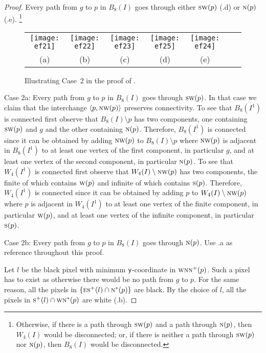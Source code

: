 \documentclass[lotsofwhite,charterfonts]{patmorin}
\newcommand{\N}{\textsc{n}}
\newcommand{\E}{\textsc{e}}
\renewcommand{\S}{\textsc{s}}
\newcommand{\SW}{\textsc{sw}}
\newcommand{\W}{\textsc{w}}
\newcommand{\NW}{\textsc{nw}}
\newcommand{\y}{\ensuremath{\protect\textup{\textsf{y}}}}
\newcommand{\ic}[2]{\langle #1,#2 \rangle}
\newcommand{\sm}{\ensuremath{\setminus}}
\begin{document}
\begin{proof}
Every path from $g$ to $p$ in $B_8(I)$ goes through  either $\SW(p)$ (.d)  or $\N(p)$ (.e). \footnote{Otherwise, if there is a path through $\SW(p)$ and a path through $\N(p)$, then $W_4(I)$ would be disconnected; or, if there is neither a path through $\SW(p)$ nor $\N(p)$, then $B_8(I)$ would be disconnected.}


\begin{figure}[htbp]
\begin{center}
\begin{tabular}{ccccccc}
\texttt{[image: ef21]} & 
\texttt{[image: ef22]} & 
\texttt{[image: ef23]} & 
\texttt{[image: ef25]} & 
\texttt{[image: ef24]} 
\\
(a) & (b) & (c) & (d) & (e)
\end{tabular}
\end{center}
\caption{Illustrating Case~2 in the proof of .}
\end{figure}


\noindent Case 2a: Every path from $g$ to $p$ in $B_8(I)$ goes through $\SW(p)$.  In that case we claim that the interchange $\ic{p}{\NW(p)}$ preserves connectivity. To see that $B_8(I^1)$ is connected first observe that $B_8(I)\sm p$ has two components, one containing $\SW(p)$ and $g$ and the other containing $\N(p)$. Therefore, $B_8(I^1)$ is connected since it can be obtained by adding $\NW(p)$ to $B_8(I)\sm p$ where $\NW(p)$ is adjacent in $B_8(I^1)$ to at least one vertex of the first component, in particular $g$, and at least one vertex of the second component, in particular $\N(p)$. To see that $W_4(I^1)$ is connected first observe that $W_4(I)\sm \NW(p)$ has two components, the finite of which contains $\W(p)$ and infinite of which contains $\S(p)$. Therefore, $W_4(I^1)$ is connected since it can be obtained by adding $p$ to $W_4(I)\sm \NW(p)$ where $p$ is adjacent in $W_4(I^1)$ to at least one vertex of the finite component, in particular $\W(p)$, and at least one vertex of the infinite component, in particular $\S(p)$.



\noindent Case 2b: Every path from $g$ to $p$ in $B_8(I)$ goes through $\N(p)$. Use .a as reference throughout this proof. 

Let $l$ be the black pixel with minimum \y-coordinate in $\W\N\N^+(p)$. Such a pixel has to exist as otherwise there would be no path from $g$ to $p$. For the same reason, all the pixels in $\{\E\S^+(l) \cap \N^*(p)\}$ are black. By the choice of $l$, all the pixels in $\S^+(l) \cap \W\N^*(p)$ are white (.b). 


\end{proof}
\end{document}
